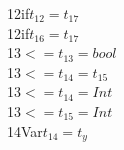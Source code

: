 \documentclass{article}
\begin{document}
\begin{multicols}{3}
12\hspace{1cm}if\hspace{1.4cm}$t_{12} = t_{17}$\\
12\hspace{1cm}if\hspace{1.4cm}$t_{16} = t_{17}$\\
13\hspace{1cm}$<=$\hspace{1cm}$t_{13} = bool$\\
13\hspace{1cm}$<=$\hspace{1cm}$t_{14} = t_{15}$\\
13\hspace{1cm}$<=$\hspace{1cm}$t_{14} = Int$\\
13\hspace{1cm}$<=$\hspace{1cm}$t_{15} = Int$\\
14\hspace{1cm}Var\hspace{1.3cm}$t_{14} = t_y$\\

\columnbreak


\end{multicols}
\end{document}
